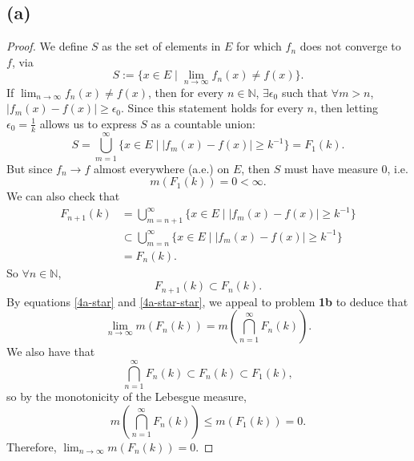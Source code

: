 \documentclass{article}
\newcommand{\N}{\mathbb{N}} %
\begin{document}
\subsection*{(a)}
\begin{proof}
	We define $S$ as the set of elements in $E$ for which $f_n$ does not converge to $f$, via 
	\begin{equation}
		S := \{x\in E \;|\; \lim_{n \to \infty}f_n(x) \neq f(x) \}.
	\end{equation}
	If $\lim_{n \to \infty} f_n(x) \neq f(x)$, then for every $n \in \N$, $\exists \epsilon_0$ such that $\forall m > n$, \\$|f_m(x) - f(x)| \geq \epsilon_0$. Since this statement holds for every $n$, then letting $\epsilon_0 = \frac{1}{k}$ allows us to express $S$ as a countable union:
	\begin{equation}
		S = \bigcup_{m=1}^{\infty} \{x \in E \;|\; |f_m(x) - f(x)| \geq k^{-1} \} = F_1(k).
	\end{equation}
	But since $f_n \rightarrow f$ almost everywhere (a.e.) on $E$, then $S$ must have measure $0$, i.e.
	\begin{equation}\label{4a-star}
		m(F_1(k)) = 0 < \infty.
	\end{equation}
	We can also check that
	\begin{align}
		F_{n+1}(k) &= \bigcup_{m=n+1}^{\infty}\{x \in E \;|\; |f_m(x) - f(x)| \geq k^{-1} \} \\
		&\subset \bigcup_{m=n}^{\infty}\{x \in E \;|\; |f_m(x) - f(x)| \geq k^{-1}\} \\
		&= F_n(k).
	\end{align}
	So $\forall n \in \N$,
	\begin{equation}\label{4a-star-star}
		F_{n+1}(k) \subset F_n(k).
	\end{equation}
	By equations \eqref{4a-star} and \eqref{4a-star-star}, we appeal to problem \textbf{1b} to deduce that
	\begin{equation}
		\lim_{n \to \infty} m(F_n(k)) = m\left(\bigcap_{n=1}^{\infty} F_n(k) \right).
	\end{equation}
	We also have that
	\begin{equation}
		\bigcap_{n=1}^{\infty} F_n(k) \subset F_n(k) \subset F_1(k),
	\end{equation}
	so by the monotonicity of the Lebesgue measure, 
	\begin{equation}
		m\left(\bigcap_{n=1}^{\infty}F_n(k)\right) \leq m(F_1(k)) = 0.
	\end{equation}
	Therefore, $\lim_{n \to \infty} m(F_n(k)) = 0$.
\end{proof}
\end{document}
